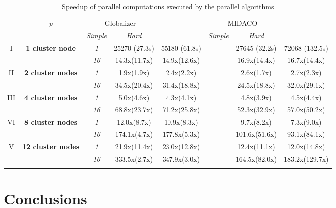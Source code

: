 \documentclass{svproc}
\begin{document}
\begin{table}
  \centering
  \caption{Speedup of parallel computations executed by the parallel algorithms}
  \label{tab:speedup}
  \begin{tabular}{cccccccc}
    \cline{3-8}\noalign{\smallskip}
    \multicolumn{2}{c}{  } & \textit{p} & \multicolumn{2}{c}{Globalizer} & &
\multicolumn{2}{c}{MIDACO}   \\
    \noalign{\smallskip} \cline{4-5} \cline{7-8}  \noalign{\smallskip}
    \multicolumn{2}{c}{  } & & \textit{Simple} & \textit{Hard} & & \textit{Simple} &
\textit{Hard}  \\
    \noalign{\smallskip}\hline
I  & \textbf{1 cluster node}  %
    & \textit{1}   & 25270 (27.3s) & 55180 (61.8s) & & 27645 (32.2s) & 72068 (132.5s)  \\
  &  & \textit{16} & 14.3x(11.7x) & 14.9x(12.6x)  & &  16.9x(14.4x) & 16.7x(14.4x) \\
  \hline \noalign{\smallskip}
II  & \textbf{2 cluster nodes}  %
  & \textit{1}      &   1.9x(1.9x) & 2.4x(2.2x)  & & 2.6x(1.7x) & 2.7x(2.3x) \\
  &   & \textit{16} & 34.5x(20.4x) & 31.4x(18.8x) & & 24.5x(18.8x) & 32.0x(29.1x) \\
    \noalign{\smallskip}\hline	\noalign{\smallskip}
III  & \textbf{4 cluster nodes}  %
& \textit{1}      & 5.0x(4.6x) & 4.3x(4.1x) & & 4.8x(3.9x) & 4.5x(4.4x) \\
&   & \textit{16} & 68.8x(23.7x) & 71.2x(25.8x) & & 52.3x(32.9x) & 57.0x(50.2x) \\
  \noalign{\smallskip}\hline	\noalign{\smallskip}
VI & \textbf{8 cluster nodes} %
& \textit{1}    & 12.0x(8.7x) & 10.9x(8.3x) & & 9.7x(8.2x)    & 7.3x(9.0x)    \\
& & \textit{16} & 174.1x(4.7x) & 177.8x(5.3x) & & 101.6x(51.6x) & 93.1x(84.1x) \\
    \noalign{\smallskip}\hline
    V & \textbf{12 cluster nodes} %
    & \textit{1}    & 21.9x(11.4x)  & 23.0x(12.8x)  & & 12.4x(11.1x)  & 12.0x(14.8x)  \\
    & & \textit{16} & 333.5x(2.7x) & 347.9x(3.0x) & & 164.5x(82.0x) & 183.2x(129.7x) \\
        \noalign{\smallskip}\hline
  \end{tabular}
\end{table}

\section{Conclusions}
\end{document}
